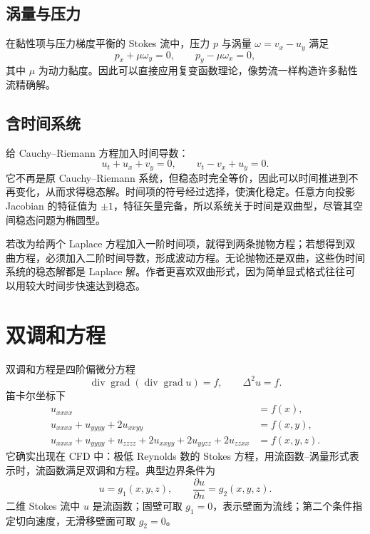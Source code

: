 \documentclass[11pt,a4paper,openany,fontset=none]{ctexbook}
\begin{document}
\subsection{涡量与压力}

在黏性项与压力梯度平衡的 Stokes 流中，压力 $p$ 与涡量 $\omega=v_x-u_y$ 满足
\begin{equation}
 p_x+\mu\omega_y=0,\qquad p_y-\mu\omega_x=0, \tag{2.9.15--16}
\end{equation}
其中 $\mu$ 为动力黏度。因此可以直接应用复变函数理论，像势流一样构造许多黏性流精确解。

\subsection{含时间系统}

给 Cauchy--Riemann 方程加入时间导数：
\begin{equation}
 u_t+u_x+v_y=0,\qquad v_t-v_x+u_y=0. \tag{2.9.17--18}
\end{equation}
它不再是原 Cauchy--Riemann 系统，但稳态时完全等价，因此可以时间推进到不再变化，从而求得稳态解。时间项的符号经过选择，使演化稳定。任意方向投影 Jacobian 的特征值为 $\pm1$，特征矢量完备，所以系统关于时间是双曲型，尽管其空间稳态问题为椭圆型。

若改为给两个 Laplace 方程加入一阶时间项，就得到两条抛物方程；若想得到双曲方程，必须加入二阶时间导数，形成波动方程。无论抛物还是双曲，这些伪时间系统的稳态解都是 Laplace 解。作者更喜欢双曲形式，因为简单显式格式往往可以用较大时间步快速达到稳态。

\section{双调和方程}

双调和方程是四阶偏微分方程
\begin{equation}
 \operatorname{div}\operatorname{grad}(\operatorname{div}\operatorname{grad}u)=f,
 \qquad \Delta^2u=f. \tag{2.10.1--2}
\end{equation}
笛卡尔坐标下
\begin{align}
 u_{xxxx}&=f(x),\\
 u_{xxxx}+u_{yyyy}+2u_{xxyy}&=f(x,y),\\
 u_{xxxx}+u_{yyyy}+u_{zzzz}+2u_{xxyy}+2u_{yyzz}+2u_{zzxx}&=f(x,y,z). \tag{2.10.3--5}
\end{align}
它确实出现在 CFD 中：极低 Reynolds 数的 Stokes 方程，用流函数--涡量形式表示时，流函数满足双调和方程。典型边界条件为
\begin{equation}
 u=g_1(x,y,z),\qquad \frac{\partial u}{\partial n}=g_2(x,y,z). \tag{2.10.6}
\end{equation}
二维 Stokes 流中 $u$ 是流函数；固壁可取 $g_1=0$，表示壁面为流线；第二个条件指定切向速度，无滑移壁面可取 $g_2=0$。
\end{document}
